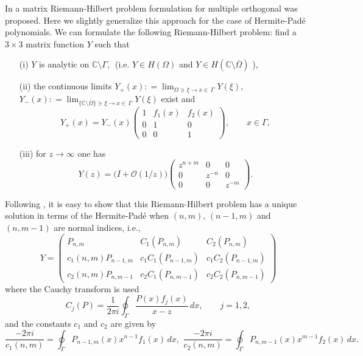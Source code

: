 \documentclass{amsart}
\theoremstyle{remark}
\numberwithin{equation}{section}
\begin{document}
In \cite{WVAGerKui} a matrix Riemann-Hilbert problem formulation for multiple orthogonal was proposed. Here we slightly generalize this approach for the case of {Her\-mite-Pad\'e}{} polynomials. We can formulate the following Riemann-Hilbert problem:
find a $3\times 3$ matrix function $Y$ such that
\begin{enumerate}
\item[(i)] $Y$ is analytic on $\mathbb{C} \setminus \Gamma,\,\,\,$(i.e. $Y\in H(\Omega)$ and $Y\in H(\mathbb{C} \setminus \overline{\Omega})$ ),
\item[(ii)] the continuous limits $Y_{+}(x): = \displaystyle\lim_{\Omega\ni\,\xi\rightarrow x\in \,\Gamma } Y(\xi)$,
$Y_{-}(x): = \displaystyle\lim_{\{\mathbb{C} \setminus \overline{\Omega}\}\ni\,\xi\rightarrow x\in \,\Gamma } Y(\xi)$ exist and
\begin{equation} \label{eq:2.1}
      Y_+(x) = Y_-(x) \begin{pmatrix}
                        1 & f_1(x) & f_2(x) \\
                        0 &  1  & 0  \\
                        0 & 0 & 1
                        \end{pmatrix}, \qquad x \in \Gamma,
\end{equation}
\item[(iii)] for $z \to \infty$ one has
\begin{equation} \label{eq:2.2}
     Y(z) = \big( I + \mathcal{O}(1/z) \big) \begin{pmatrix} z^{n+m} & 0 & 0 \\ 0 & z^{-n} & 0 \\ 0 & 0 & z^{-m} \end{pmatrix}.
\end{equation}
\end{enumerate}
Following \cite{FIK1992}, \cite{WVAGerKui} it is easy to show that this Riemann-Hilbert problem
has a unique solution in terms of  the {Her\-mite-Pad\'e}{} when $(n,m)$, $(n-1,m)$ and $(n,m-1)$
are normal indices, i.e.,
\begin{equation}  \label{eq:2.3}
  Y = \begin{pmatrix}
      P_{n,m} & C_1(P_{n,m}) & C_2(P_{n,m}) \\
      c_1(n,m) P_{n-1,m} & c_1 C_1(P_{n-1,m}) & c_1 C_2(P_{n-1,m}) \\
      c_2(n,m) P_{n,m-1} & c_2 C_1(P_{n,m-1}) & c_2 C_2(P_{n,m-1})
      \end{pmatrix}
\end{equation}
where the Cauchy transform is used
\[
C_j(P) = \frac{1}{2\pi i} \oint_{\Gamma} \frac{P(x)f_j(x)}{x-z}\, dx, \qquad j=1,2,
\]
and the constants $c_1$ and $c_2$ are given by 
$$\frac{-2\pi i}{c_1(n,m)} =  \oint_{\Gamma} P_{n-1,m}(x) x^{n-1}f_1(x)\, dx,  \,\,
\frac{-2\pi i}{c_2(n,m)} =  \oint_{\Gamma}P_{n,m-1}(x) x^{m-1}f_2(x)\, dx. $$
\end{document}

